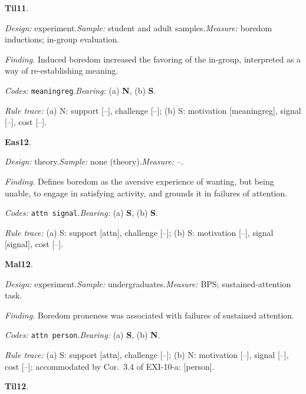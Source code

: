 \medskip
{}
\noindent\textbf{Til11}\enspace \citet{vanTilburgIgou2011}.\par
{\small\noindent\textit{Design:} experiment.\quad \textit{Sample:} student and adult samples.\quad \textit{Measure:} boredom inductions; in-group evaluation.\par
\noindent\textit{Finding.} Induced boredom increased the favoring of the in-group, interpreted as a way of re-establishing meaning.\par
\noindent\textit{Codes:} \texttt{meaningreg}.\quad \textit{Bearing:} (a) \textbf{N}, (b) \textbf{S}.\par
\noindent\textit{Rule trace:} (a) N: support {[}--{]}, challenge {[}--{]}; (b) S: motivation {[}meaningreg{]}, signal {[}--{]}, cost {[}--{]}.\par}
\medskip
{}
\noindent\textbf{Eas12}\enspace \citet{EastwoodEtAl2012}.\par
{\small\noindent\textit{Design:} theory.\quad \textit{Sample:} none (theory).\quad \textit{Measure:} --.\par
\noindent\textit{Finding.} Defines boredom as the aversive experience of wanting, but being unable, to engage in satisfying activity, and grounds it in failures of attention.\par
\noindent\textit{Codes:} \texttt{attn signal}.\quad \textit{Bearing:} (a) \textbf{S}, (b) \textbf{S}.\par
\noindent\textit{Rule trace:} (a) S: support {[}attn{]}, challenge {[}--{]}; (b) S: motivation {[}--{]}, signal {[}signal{]}, cost {[}--{]}.\par}
\medskip
{}
\noindent\textbf{Mal12}\enspace \citet{Malkovsky2012}.\par
{\small\noindent\textit{Design:} experiment.\quad \textit{Sample:} undergraduates.\quad \textit{Measure:} BPS; sustained-attention task.\par
\noindent\textit{Finding.} Boredom proneness was associated with failures of sustained attention.\par
\noindent\textit{Codes:} \texttt{attn person}.\quad \textit{Bearing:} (a) \textbf{S}, (b) \textbf{N}.\par
\noindent\textit{Rule trace:} (a) S: support {[}attn{]}, challenge {[}--{]}; (b) N: motivation {[}--{]}, signal {[}--{]}, cost {[}--{]}; accommodated by Cor.~3.4 of EXI-10-a: {[}person{]}.\par}
\medskip
{}
\noindent\textbf{Til12}\enspace \citet{vanTilburgIgou2012}.\par
